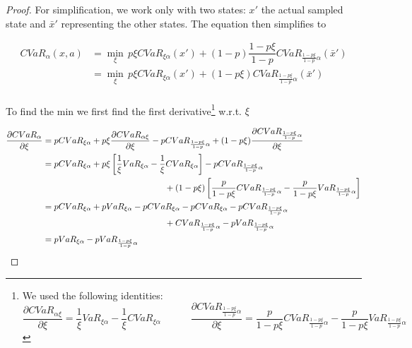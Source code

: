 \begin{proof}
For simplification, we work only with two states: $x'$ the actual sampled state and $\bar{x}'$ representing the other states. The equation then simplifies to

\begin{equation}\label{eqn:cvardecomp2}
\begin{split}
CVaR_\alpha(x, a)&=\min_{\xi} \, p\xi CVaR_{\xi\alpha}(x') + (1-p)\dfrac{1-p\xi}{1-p}CVaR_{\frac{1-p\xi}{1-p}\alpha}(\bar{x}')\\
&=\min_{\xi} \, p\xi CVaR_{\xi\alpha}(x') + (1-p\xi)CVaR_{\frac{1-p\xi}{1-p}\alpha}(\bar{x}')\\
\end{split}
\end{equation}

To find the min we first find the first derivative\footnote{
We used the following identities:
\begin{equation*}
\dfrac{\partial CVaR_{\alpha\xi}}{\partial \xi} = \frac{1}{\xi}VaR_{\xi\alpha}-\frac{1}{\xi}CVaR_{\xi\alpha}\quad\quad\quad
\dfrac{\partial CVaR_{\frac{1-p\xi}{1-p}\alpha}}{\partial\xi} = \frac{p}{1-p\xi}CVaR_{\frac{1-p\xi}{1-p}\alpha}	-	\frac{p}{1-p\xi}VaR_{\frac{1-p\xi}{1-p}\alpha}
\end{equation*}
} w.r.t. $\xi$

\begin{equation}
\begin{split}
\dfrac{\partial CVaR_\alpha}{\partial \xi} &= pCVaR_{\xi\alpha} + p\xi \dfrac{\partial CVaR_{\alpha\xi}}{\partial \xi} - pCVaR_{\frac{1-p\xi}{1-p}\alpha} + (1 - p\xi)\dfrac{\partial CVaR_{\frac{1-p\xi}{1-p}\alpha}}{\partial\xi}\\
&= pCVaR_{\xi\alpha} + p\xi\left[	\frac{1}{\xi}VaR_{\xi\alpha}-\frac{1}{\xi}CVaR_{\xi\alpha}	\right] - pCVaR_{\frac{1-p\xi}{1-p}\alpha} \\&\hspace*{5cm} + (1-p\xi)\left[	\frac{p}{1-p\xi}CVaR_{\frac{1-p\xi}{1-p}\alpha}	-	\frac{p}{1-p\xi}VaR_{\frac{1-p\xi}{1-p}\alpha}\right]\\
&= pCVaR_{\xi\alpha} + pVaR_{\xi\alpha} - pCVaR_{\xi\alpha} - pCVaR_{\xi\alpha} - pCVaR_{\frac{1-p\xi}{1-p}\alpha} \\&\hspace*{5cm} + CVaR_{\frac{1-p\xi}{1-p}\alpha} - pVaR_{\frac{1-p\xi}{1-p}\alpha}\\
&= pVaR_{\xi\alpha} - pVaR_{\frac{1-p\xi}{1-p}\alpha}
\end{split}
\end{equation}


\end{proof}
